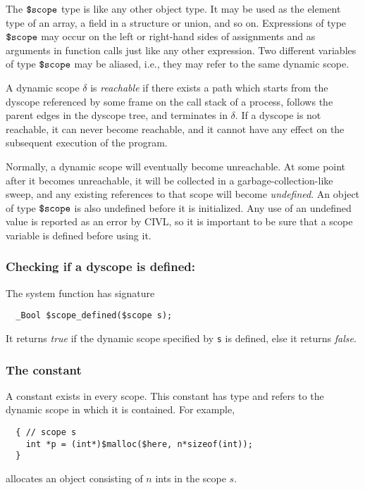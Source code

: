The $\mbox{\texttt{\${}scope}}$ type is like any other object type.  It may be used as
the element type of an array, a field in a structure or union, and so
on.  Expressions of type $\mbox{\texttt{\${}scope}}$ may occur on the left or right-hand
sides of assignments and as arguments in function calls just like any
other expression.  Two different variables of type $\mbox{\texttt{\${}scope}}$ may be
aliased, i.e., they may refer to the same dynamic scope.

A dynamic scope $\delta$ is \emph{reachable} if there exists a path
which starts from the dyscope referenced by some frame on the call
stack of a process, follows the parent edges in the dyscope tree, and
terminates in $\delta$.  If a dyscope is not reachable, it can never
become reachable, and it cannot have any effect on the subsequent
execution of the program.

Normally, a dynamic scope will eventually become unreachable.  At some
point after it becomes unreachable, it will be collected in a
garbage-collection-like sweep, and any existing references to that
scope will become \emph{undefined}.  An object of type $\mbox{\texttt{\${}scope}}$ is
also undefined before it is initialized.  Any use of an undefined
value is reported as an error by CIVL, so it is important to be sure
that a scope variable is defined before using it.


\subsubsection{Checking if a dyscope is defined: \cscopedefined}

The system function \cscopedefined{} has signature
\begin{verbatim}
  _Bool $scope_defined($scope s);
\end{verbatim}
It returns \emph{true} if the dynamic scope specified by \texttt{s} is
defined, else it returns \emph{false}.

\subsubsection{The constant \chere}

A constant \chere{} exists in every scope.  This constant has
type \cscope{} and refers to the dynamic scope in which it is
contained.  For example,
\begin{verbatim}
  { // scope s
    int *p = (int*)$malloc($here, n*sizeof(int));
  }
\end{verbatim}
allocates an object consisting of $n$ ints in the scope $s$.

